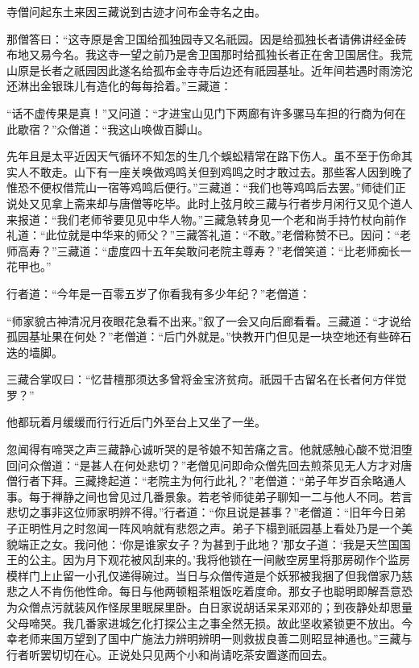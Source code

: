 \documentclass[12pt,UTF8]{ctexbook}
\begin{document}
{	寺僧问起东土来因三藏说到古迹才问布金寺名之由。
	
	那僧答曰：“这寺原是舍卫国给孤独园寺又名祇园。因是给孤独长者请佛讲经金砖布地又易今名。我这寺一望之前乃是舍卫国那时给孤独长者正在舍卫国居住。我荒山原是长者之祇园因此遂名给孤布金寺寺后边还有祇园基址。近年间若遇时雨滂沱还淋出金银珠儿有造化的每每拾着。”三藏道：
	
	“话不虚传果是真！”又问道：“才进宝山见门下两廊有许多骡马车担的行商为何在此歇宿？”众僧道：“我这山唤做百脚山。
	
	先年且是太平近因天气循环不知怎的生几个蜈蚣精常在路下伤人。虽不至于伤命其实人不敢走。山下有一座关唤做鸡鸣关但到鸡鸣之时才敢过去。那些客人因到晚了惟恐不便权借荒山一宿等鸡鸣后便行。”三藏道：“我们也等鸡鸣后去罢。”师徒们正说处又见拿上斋来却与唐僧等吃毕。此时上弦月皎三藏与行者步月闲行又见个道人来报道：“我们老师爷要见见中华人物。”三藏急转身见一个老和尚手持竹杖向前作礼道：“此位就是中华来的师父？”三藏答礼道：“不敢。”老僧称赞不已。因问：“老师高寿？”三藏道：“虚度四十五年矣敢问老院主尊寿？”老僧笑道：“比老师痴长一花甲也。”
	
	行者道：“今年是一百零五岁了你看我有多少年纪？”老僧道：
	
	“师家貌古神清况月夜眼花急看不出来。”叙了一会又向后廊看看。三藏道：“才说给孤园基址果在何处？”老僧道：“后门外就是。”快教开门但见是一块空地还有些碎石迭的墙脚。
	
	三藏合掌叹曰：“忆昔檀那须达多曾将金宝济贫疴。祇园千古留名在长者何方伴觉罗？”
	
	他都玩着月缓缓而行行近后门外至台上又坐了一坐。
	
	忽闻得有啼哭之声三藏静心诚听哭的是爷娘不知苦痛之言。他就感触心酸不觉泪堕回问众僧道：“是甚人在何处悲切？”老僧见问即命众僧先回去煎茶见无人方才对唐僧行者下拜。三藏搀起道：“老院主为何行此礼？”老僧道：“弟子年岁百余略通人事。每于禅静之间也曾见过几番景象。若老爷师徒弟子聊知一二与他人不同。若言悲切之事非这位师家明辨不得。”行者道：“你且说是甚事？”老僧道：“旧年今日弟子正明性月之时忽闻一阵风响就有悲怨之声。弟子下榻到祇园基上看处乃是一个美貌端正之女。我问他：‘你是谁家女子？为甚到于此地？’那女子道：‘我是天竺国国王的公主。因为月下观花被风刮来的。’我将他锁在一间敝空房里将那房砌作个监房模样门上止留一小孔仅递得碗过。当日与众僧传道是个妖邪被我捆了但我僧家乃慈悲之人不肯伤他性命。每日与他两顿粗茶粗饭吃着度命。那女子也聪明即解吾意恐为众僧点污就装风作怪尿里眠屎里卧。白日家说胡话呆呆邓邓的；到夜静处却思量父母啼哭。我几番家进城乞化打探公主之事全然无损。故此坚收紧锁更不放出。今幸老师来国万望到了国中广施法力辨明辨明一则救拔良善二则昭显神通也。”三藏与行者听罢切切在心。正说处只见两个小和尚请吃茶安置遂而回去。
	
}
\end{document}
